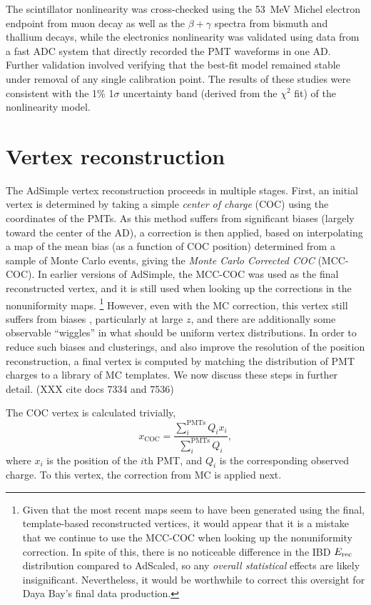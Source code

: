 \documentclass[../thesis.tex]{subfiles}
\begin{document}
The scintillator nonlinearity was cross-checked using the 53~MeV Michel electron endpoint from muon decay as well as the $\beta+\gamma$ spectra from bismuth and thallium decays, while the electronics nonlinearity was validated using data from a fast ADC system that directly recorded the PMT waveforms in one AD. Further validation involved verifying that the best-fit model remained stable under removal of any single calibration point. The results of these studies were consistent with the 1\% 1$\sigma$ uncertainty band (derived from the $\chi^2$ fit) of the nonlinearity model.

\section{Vertex reconstruction}
\label{sec:reconVertex}

The AdSimple vertex reconstruction proceeds in multiple stages. First, an initial vertex is determined by taking a simple \emph{center of charge} (COC) using the coordinates of the PMTs. As this method suffers from significant biases (largely toward the center of the AD), a correction is then applied, based on interpolating a map of the mean bias (as a function of COC position) determined from a sample of Monte Carlo events, giving the \emph{Monte Carlo Corrected COC} (MCC-COC). In earlier versions of AdSimple, the MCC-COC was used as the final reconstructed vertex, and it is still used when looking up the corrections in the nonuniformity maps. \footnote{Given that the most recent maps seem to have been generated using the final, template-based reconstructed vertices, it would appear that it is a mistake that we continue to use the MCC-COC when looking up the nonuniformity correction. In spite of this, there is no noticeable difference in the IBD $E_\mathrm{rec}$ distribution compared to AdScaled, so any \emph{overall statistical} effects are likely insignificant. Nevertheless, it would be worthwhile to correct this oversight for Daya Bay's final data production.} However, even with the MC correction, this vertex still suffers from biases , particularly at large $z$, and there are additionally some observable ``wiggles'' in what should be uniform vertex distributions. In order to reduce such biases and clusterings, and also improve the resolution of the position reconstruction, a final vertex is computed by matching the distribution of PMT charges to a library of MC templates. We now discuss these steps in further detail. (XXX cite docs 7334 and 7536)


The COC vertex is calculated trivially,
\begin{equation*}
  x_{\mathrm{COC}} = \frac{\sum_{i}^{\mathrm{PMTs}} Q_i x_i}{\sum_i^{\mathrm{PMTs}} Q_i},
\end{equation*}
where $x_i$ is the position of the $i$th PMT, and $Q_i$ is the corresponding observed charge. To this vertex, the correction from MC is applied next.
\end{document}
